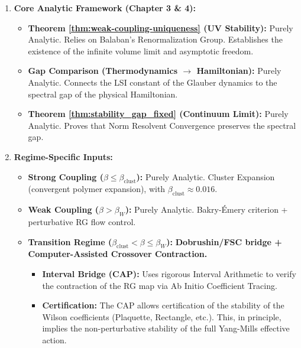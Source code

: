 \begin{enumerate}
    \item \textbf{Core Analytic Framework (Chapter 3 \& 4):}
    \begin{itemize}
        \item \textbf{Theorem \ref{thm:weak-coupling-uniqueness} (UV Stability):} Purely Analytic. Relies on Balaban's Renormalization Group. Establishes the existence of the infinite volume limit and asymptotic freedom.
        \item \textbf{Gap Comparison (Thermodynamics \texorpdfstring{$\to$}{->} Hamiltonian):} Purely Analytic. Connects the LSI constant of the Glauber dynamics to the spectral gap of the physical Hamiltonian.
        \item \textbf{Theorem \ref{thm:stability_gap_fixed} (Continuum Limit):} Purely Analytic. Proves that Norm Resolvent Convergence preserves the spectral gap.
    \end{itemize}

    \item \textbf{Regime-Specific Inputs:}
    \begin{itemize}
    \item \textbf{Strong Coupling ($\beta \le \beta_{\mathrm{clust}}$):} Purely Analytic. Cluster Expansion (convergent polymer expansion), with $\beta_{\mathrm{clust}}\approx 0.016$.
        \item \textbf{Weak Coupling ($\beta > \beta_W$):} Purely Analytic. Bakry-\'{E}mery criterion + perturbative RG flow control.
    \item \textbf{Transition Regime ($\beta_{\mathrm{clust}} < \beta \le \beta_W$):} \textbf{Dobrushin/FSC bridge + Computer-Assisted Crossover Contraction.}
        \begin{itemize}
            \item \textbf{Interval Bridge (CAP):} Uses rigorous Interval Arithmetic to verify the contraction of the RG map via Ab Initio Coefficient Tracing.
            \item \textbf{Certification:} The CAP allows certification of the stability of the Wilson coefficients (Plaquette, Rectangle, etc.). This, in principle, implies the non-perturbative stability of the full Yang-Mills effective action.
        \end{itemize}
    \end{itemize}
\end{enumerate}

